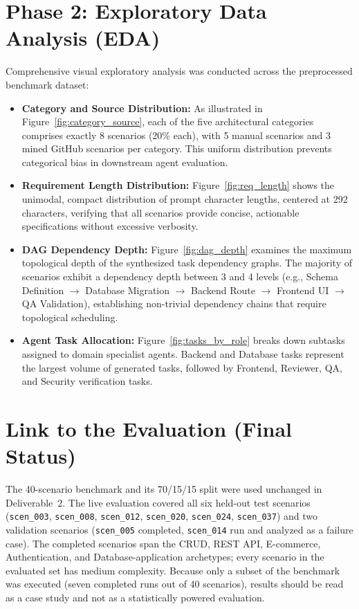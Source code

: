 \documentclass[10pt,journal,compsoc]{IEEEtran}
\begin{document}
\section{Phase 2: Exploratory Data Analysis (EDA)}

Comprehensive visual exploratory analysis was conducted across the preprocessed benchmark dataset:
\begin{itemize}
    \item \textbf{Category and Source Distribution:} As illustrated in Figure~\ref{fig:category_source}, each of the five architectural categories comprises exactly 8 scenarios (20\% each), with 5 manual scenarios and 3 mined GitHub scenarios per category. This uniform distribution prevents categorical bias in downstream agent evaluation.
    \item \textbf{Requirement Length Distribution:} Figure~\ref{fig:req_length} shows the unimodal, compact distribution of prompt character lengths, centered at 292 characters, verifying that all scenarios provide concise, actionable specifications without excessive verbosity.
    \item \textbf{DAG Dependency Depth:} Figure~\ref{fig:dag_depth} examines the maximum topological depth of the synthesized task dependency graphs. The majority of scenarios exhibit a dependency depth between 3 and 4 levels (e.g., Schema Definition $\rightarrow$ Database Migration $\rightarrow$ Backend Route $\rightarrow$ Frontend UI $\rightarrow$ QA Validation), establishing non-trivial dependency chains that require topological scheduling.
    \item \textbf{Agent Task Allocation:} Figure~\ref{fig:tasks_by_role} breaks down subtasks assigned to domain specialist agents. Backend and Database tasks represent the largest volume of generated tasks, followed by Frontend, Reviewer, QA, and Security verification tasks.
\end{itemize}


\section{Link to the Evaluation (Final Status)}
The 40-scenario benchmark and its 70/15/15 split were used unchanged in Deliverable~2. The live evaluation covered all six held-out test scenarios (\texttt{scen\_003}, \texttt{scen\_008}, \texttt{scen\_012}, \texttt{scen\_020}, \texttt{scen\_024}, \texttt{scen\_037}) and two validation scenarios (\texttt{scen\_005} completed, \texttt{scen\_014} run and analyzed as a failure case). The completed scenarios span the CRUD, REST API, E-commerce, Authentication, and Database-application archetypes; every scenario in the evaluated set has medium complexity. Because only a subset of the benchmark was executed (seven completed runs out of 40 scenarios), results should be read as a case study and not as a statistically powered evaluation.
\end{document}
